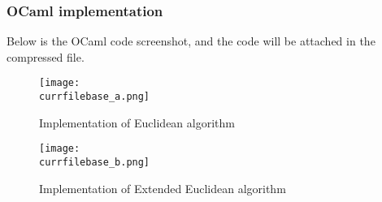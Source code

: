 \documentclass[catalog.tex]{subfiles}
\begin{document}
\subsubsection{OCaml implementation}
Below is the OCaml code screenshot, and the code will be attached in the compressed file.

\begin{figure}[!htb]
    \centering
    \texttt{[image: \\currfilebase\_a.png]}
    \caption{Implementation of Euclidean algorithm}
    \label{fig:\currfilebase_a}
\end{figure}

\begin{figure}[!htb]
    \centering
    \texttt{[image: \\currfilebase\_b.png]}
    \caption{Implementation of Extended Euclidean algorithm}
    \label{fig:\currfilebase_b}
\end{figure}

\singlespacing
\printbibliography[title={References.},resetnumbers=true,heading=subbibliography]
\end{document}
